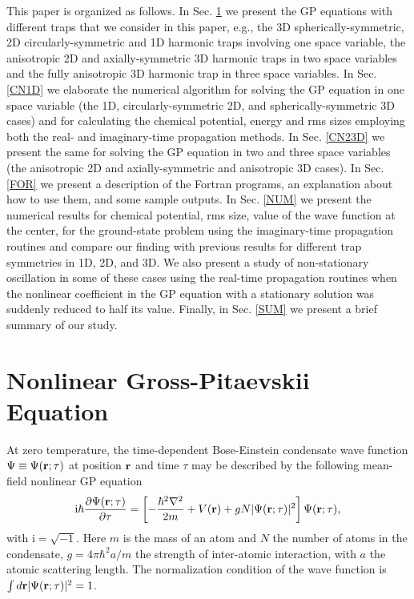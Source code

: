 \documentclass[onecolumn]{elsart3p}
\begin{document}
{This paper is organized as follows.} In Sec. \ref{gpe} we present
the GP equations with different traps that  we consider in this paper, e.g., the
3D spherically-symmetric, 2D circularly-symmetric  and 1D harmonic traps
involving one space variable, the anisotropic 2D  and axially-symmetric 3D
harmonic traps in two space variables and the fully anisotropic 3D harmonic trap
in three space variables. In Sec. \ref{CN1D} we elaborate the numerical
algorithm for solving the GP equation in one space variable (the 1D, 
circularly-symmetric 2D, and spherically-symmetric 3D cases) 
and for calculating
the chemical potential, energy and rms sizes  employing both the real- and
imaginary-time propagation methods. 
In Sec. \ref{CN23D} we present the same  for
solving the GP equation in two and three space variables (the anisotropic  2D
and axially-symmetric and anisotropic 3D cases). In Sec. \ref{FOR} we present a
description of the Fortran programs, an explanation about how to use them, and
some sample outputs. In Sec. \ref{NUM} we present the numerical results for
chemical potential, rms size, value of the wave function at the center, for the
ground-state
problem using the imaginary-time propagation routines and compare our
finding with previous results for different trap symmetries in 1D, 2D, and 3D. 
We also present a study of non-stationary oscillation in some of these cases
using the real-time propagation routines when the nonlinear coefficient in the
GP equation with a stationary solution was suddenly reduced to half its value.
Finally, in Sec. \ref{SUM} we present a brief summary of our study.


\section{Nonlinear Gross-Pitaevskii Equation}
\label{gpe}

At zero temperature, the time-dependent Bose-Einstein condensate wave function
$\Psi \equiv \Psi({\bf r};\tau)$ at position ${\bf r}$ and time $\tau $ may be
described by the following  mean-field nonlinear GP equation \cite{review}
\begin{eqnarray}
\mbox{i}\hbar\frac{\partial \Psi({\bf r};\tau) }{\partial \tau}  =
\left[-\frac{\hbar^2\nabla
^2}{2m} + V({\bf r}) + gN\vert\Psi({\bf r};\tau) \vert^2
\right]\Psi({\bf r};\tau),
\label{eqn:gp0}
\end{eqnarray}
with $\mbox{i}=\sqrt{-1}$. Here $m$ is the mass of an atom and   $N$ the number
of atoms in the condensate, $g=4\pi\hbar^2 a/m $ the strength of inter-atomic
interaction, with $a$ the atomic scattering length. The normalization condition
of the wave function is $\int d{\bf r} \vert \Psi({\bf r};\tau)\vert^2 = 1$.
\end{document}
